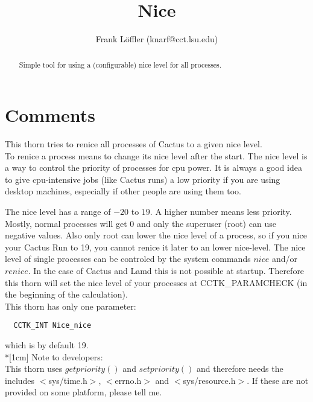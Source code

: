\documentclass{article}
\begin{document}
\title{Nice}
\author{Frank L\"offler (knarf@cct.lsu.edu)}

\maketitle


\begin{abstract}
Simple tool for using a (configurable) nice level for all processes.
\end{abstract}

\section{Comments}

This thorn tries to renice all processes of Cactus to a given nice level.\\
To renice a process means to change its nice level after the start. The nice
level is a way to control the priority of processes for cpu power. It is
always a good idea to give cpu-intensive jobs (like Cactus runs) a low
priority if you are using desktop machines, especially if other people are
using them too.

The nice level has a range of $-20$ to $19$. A higher number means less
priority. Mostly, normal processes will get $0$ and only the superuser
(root) can use negative values. Also only root can lower the nice level
of a process, so if you nice your Cactus Run to 19, you cannot renice it
later to an lower nice-level. The nice level of single
processes can be controled by the system commands $nice$ and/or $renice$.
In the case of Cactus and Lamd this is not possible at startup. Therefore
this thorn will set the nice level of your processes at CCTK\_PARAMCHECK
(in the beginning of the calculation).\\
This thorn has only one parameter:
\begin{verbatim}
  CCTK_INT Nice_nice
\end{verbatim}
which is by default 19.\\*[1cm]
Note to developers:\\
This thorn uses $getpriority()$ and $setpriority()$ and therefore needs
the includes $<$sys/time.h$>$, $<$errno.h$>$ and $<$sys/resource.h$>$.
If these are not provided on some platform, please tell me.
\end{document}
